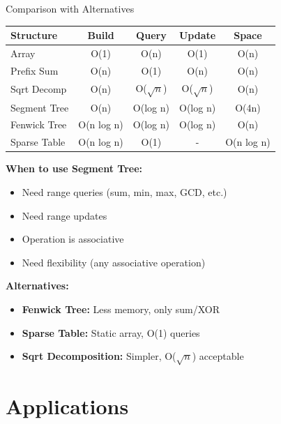 \documentclass[aspectratio=169]{beamer}
\begin{document}
\begin{frame}{Comparison with Alternatives}
  \begin{table}
    \centering
    \small
    \begin{tabular}{|l|c|c|c|c|}
      \hline
      \textbf{Structure} & \textbf{Build} & \textbf{Query} & \textbf{Update} & \textbf{Space} \\
      \hline
      Array & O(1) & O(n) & O(1) & O(n) \\
      \hline
      Prefix Sum & O(n) & O(1) & O(n) & O(n) \\
      \hline
      Sqrt Decomp & O(n) & O($\sqrt{n}$) & O($\sqrt{n}$) & O(n) \\
      \hline
      Segment Tree & O(n) & O(log n) & O(log n) & O(4n) \\
      \hline
      Fenwick Tree & O(n log n) & O(log n) & O(log n) & O(n) \\
      \hline
      Sparse Table & O(n log n) & O(1) & - & O(n log n) \\
      \hline
    \end{tabular}
  \end{table}

  \vspace{0.5cm}
  \textbf{When to use Segment Tree:}
  \begin{itemize}
    \item Need range queries (sum, min, max, GCD, etc.)
    \item Need range updates
    \item Operation is associative
    \item Need flexibility (any associative operation)
  \end{itemize}

  \vspace{0.3cm}
  \textbf{Alternatives:}
  \begin{itemize}
    \item \textbf{Fenwick Tree:} Less memory, only sum/XOR
    \item \textbf{Sparse Table:} Static array, O(1) queries
    \item \textbf{Sqrt Decomposition:} Simpler, O($\sqrt{n}$) acceptable
  \end{itemize}
\end{frame}

\section{Applications}
\end{document}
